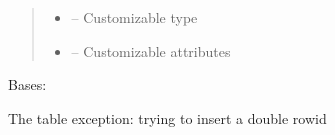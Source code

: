 \documentclass[letterpaper,10pt,english]{sphinxmanual}
\begin{document}
\begin{savenotes}
\begin{fulllineitems}
\begin{quote}
\begin{description}
\begin{itemize}
\item {} 
\sphinxAtStartPar
{} – Customizable type

\item {} 
\sphinxAtStartPar
{} – Customizable attributes

\end{itemize}

\end{description}\end{quote}

\end{fulllineitems}\end{savenotes}


\begin{savenotes}\begin{fulllineitems}
\label{\detokenize{eezz:eezz.table.TTableInsertException}}
\pysigstartsignatures
{}
\pysigstopsignatures
\sphinxAtStartPar
Bases: 

\sphinxAtStartPar
The table exception: trying to insert a double row\sphinxhyphen{}id

\end{fulllineitems}\end{savenotes}

\end{document}
